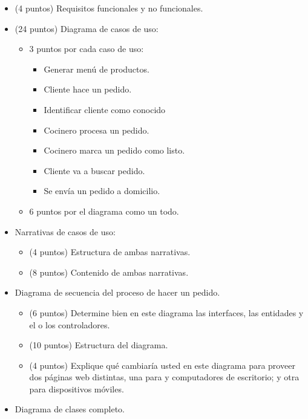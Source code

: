 \documentclass[11pt,letterpaper]{article}
\begin{document}
\begin{spacing}{1.2}
\begin{NewAnswer}
    \begin{itemize}
        \item (4 puntos) Requisitos funcionales y no funcionales.
        \item (24 puntos) Diagrama de casos de uso:
        \begin{itemize}
            \item 3 puntos por cada caso de uso:
            \begin{itemize}
                \item Generar menú de productos.
                \item Cliente hace un pedido.
                \item Identificar cliente como conocido
                \item Cocinero procesa un pedido.
                \item Cocinero marca un pedido como listo.
                \item Cliente va a buscar pedido.
                \item Se envía un pedido a domicilio.
            \end{itemize}
            \item 6 puntos por el diagrama como un todo.
        \end{itemize}
        \item Narrativas de casos de uso:
        \begin{itemize}
            \item (4 puntos) Estructura de ambas narrativas.
            \item (8 puntos) Contenido de ambas narrativas.
        \end{itemize}
        \item Diagrama de secuencia del proceso de hacer un pedido.
        \begin{itemize}
            \item (6 puntos) Determine bien en este diagrama las interfaces, las entidades y el o los controladores.
            \item (10 puntos) Estructura del diagrama.
            \item (4 puntos) Explique qué cambiaría usted en este diagrama para proveer dos páginas web distintas,
                una para  y computadores de escritorio; y otra para dispositivos móviles.
        \end{itemize}
        \item Diagrama de clases completo.

\end{itemize}
\end{NewAnswer}
\end{spacing}
\end{document}

